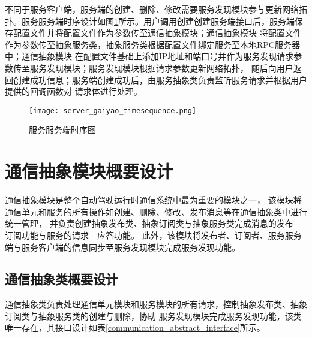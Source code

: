 不同于服务客户端，服务端的创建、删除、修改需要服务发现模块参与更新网络拓扑。服务服务端时序设计如图\ref{server_gaiyao_timesequence}所示。用户调用创建创建服务端接口后，服务端保存配置文件并将配置文件作为参数传至通信抽象模块；通信抽象模块
将配置文件作为参数传至抽象服务类，抽象服务类根据配置文件绑定服务至本地RPC服务器中；通信抽象模块
在配置文件基础上添加IP地址和端口号并作为服务发现请求参数传至服务发现模块；服务发现模块根据请求参数更新网络拓扑，
随后向用户返回创建成功信息；服务端创建成功后，由服务抽象类负责监听服务请求并根据用户提供的回调函数对
请求体进行处理。

\begin{figure}[H]
  \centering
  \texttt{[image: server\_gaiyao\_timesequence.png]}
  \caption{服务服务端时序图}
  \label{server_gaiyao_timesequence}
\end{figure}


\section{通信抽象模块概要设计}
通信抽象模块是整个自动驾驶运行时通信系统中最为重要的模块之一，
该模块将通信单元和服务的所有操作如创建、删除、修改、发布消息等在通信抽象类中进行统一管理，
并负责创建抽象发布类、抽象订阅类与抽象服务类完成消息的发布－订阅功能与服务的请求－应答功能。
此外，该模块将发布者、订阅者、服务服务端与服务客户端的信息同步至服务发现模块完成服务发现功能。


\subsection{通信抽象类概要设计}
通信抽象类负责处理通信单元模块和服务模块的所有请求，控制抽象发布类、抽象订阅类与抽象服务类的创建与删除，协助
服务发现模块完成服务发现功能，该类唯一存在，其接口设计如表\ref{communication_abstract_interface}所示。
 
